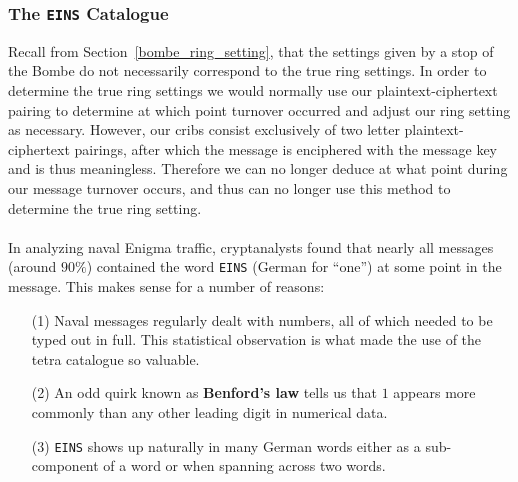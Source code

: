\subsubsection{The \texttt{EINS} Catalogue}
Recall from Section~\ref{bombe_ring_setting}, that the settings
given by a stop of the Bombe do not necessarily correspond to the
true ring settings. In order to determine the true ring settings we
would normally use our plaintext-ciphertext pairing to determine at
which point turnover occurred and adjust our ring setting as
necessary. However, our cribs consist exclusively of two letter
plaintext-ciphertext pairings, after which the message is
enciphered with the message key and is thus meaningless. Therefore
we can no longer deduce at what point during our message turnover
occurs, and thus can no longer use this method to determine the true
ring setting.
\\\\In analyzing naval Enigma traffic, cryptanalysts found that
nearly all messages (around $90\%$) contained the word
\texttt{EINS} (German for ``one'') at some point in the message.
This makes sense for a number of reasons:
\begin{enumerate}
  \item[(1)] Naval messages regularly dealt with numbers, all of which
    needed to be typed out in full. This statistical observation is
    what made the use of the tetra catalogue so valuable.
  \item[(2)] An odd quirk known as {\bf{Benford's law}} tells us that
    $1$ appears more commonly than any other leading digit in numerical data.
  \item[(3)] \texttt{EINS} shows up naturally in many German words
    either as a sub-component of a word or when spanning across two words.
\end{enumerate}

